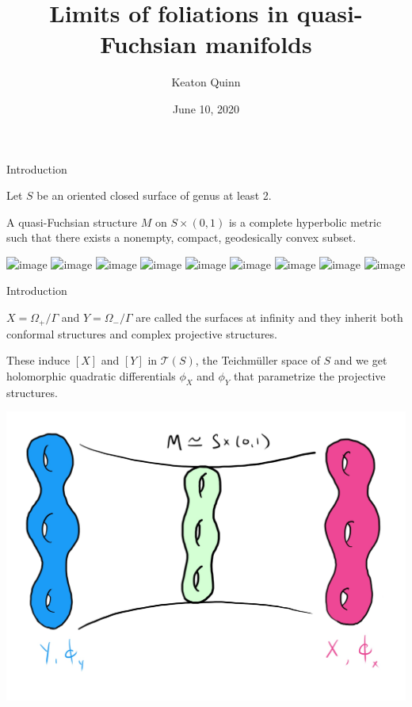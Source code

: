 \documentclass[professionalfont]{beamer}
\title{Limits of foliations in quasi-Fuchsian manifolds}
\author{Keaton Quinn}
\institute{University of Illinois at Chicago}
\date{June 10, 2020}
\begin{document}
\makeatletter
{}
{
}
\makeatother



\begin{frame}
\titlepage
\end{frame}




\begin{frame}{Introduction}

Let $S$ be an oriented closed surface of genus at least 2.\pause

A quasi-Fuchsian structure $M$ on $S \times (0,1)$ is a complete hyperbolic metric such that there exists a nonempty, compact, geodesically convex subset.

\begin{center}
\includegraphics<1-2|handout:0>[scale=0.09]{Blank}%
\includegraphics<3|handout:0>[scale=0.09]{QF-1.jpg}%
\includegraphics<4|handout:0>[scale=0.09]{QF-2.jpg}%
\includegraphics<5|handout:0>[scale=0.09]{QF-3.jpg}%
\includegraphics<6|handout:0>[scale=0.09]{QF-4.jpg}%
\includegraphics<7|handout:0>[scale=0.09]{QF-5.jpg}%
\includegraphics<8|handout:0>[scale=0.09]{QF-6.jpg}%
\includegraphics<9|handout:0>[scale=0.09]{QF-7.jpg}%
\includegraphics<10>[scale=0.09]{QF-8.jpg}%
\end{center}
	
\end{frame}




\begin{frame}{Introduction}
	
$X = \Omega_+/\Gamma$ and $Y = \Omega_-/\Gamma$ are called the surfaces at infinity and they inherit both conformal structures and complex projective structures. 
\newline

These induce $[X]$ and $[Y]$ in $\mathcal{T}(S)$, the Teichm\"uller space of $S$ and we get holomorphic quadratic differentials $\phi_X$ and $\phi_Y$ that parametrize the projective structures.

\centering\includegraphics[scale=0.1]{QF-sideways.jpg}


\end{frame}
\end{document}
